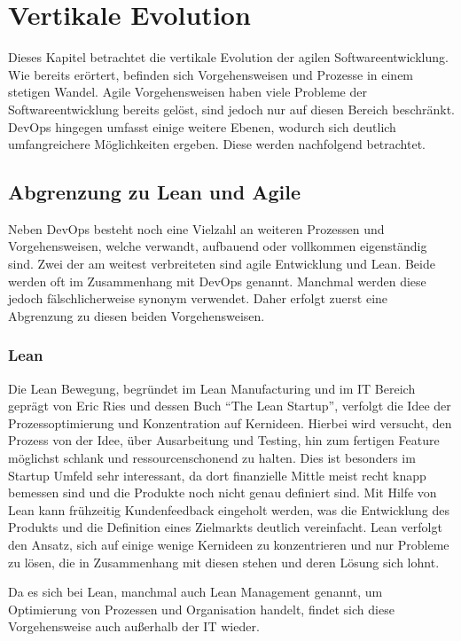\chapter{Vertikale Evolution} %
Dieses Kapitel betrachtet die vertikale Evolution der agilen Softwareentwicklung. Wie bereits erörtert, befinden sich Vorgehensweisen und Prozesse in einem stetigen Wandel. Agile Vorgehensweisen haben viele Probleme der Softwareentwicklung bereits gelöst, sind jedoch nur auf diesen Bereich beschränkt. DevOps hingegen umfasst einige weitere Ebenen, wodurch sich deutlich umfangreichere Möglichkeiten ergeben. Diese werden nachfolgend betrachtet.

\section{Abgrenzung zu Lean und Agile} %
Neben DevOps besteht noch eine Vielzahl an weiteren Prozessen und Vorgehensweisen, welche verwandt, aufbauend oder vollkommen eigenständig sind. Zwei der am weitest verbreiteten sind agile Entwicklung und Lean. Beide werden oft im Zusammenhang mit DevOps genannt. Manchmal werden diese jedoch fälschlicherweise synonym verwendet. Daher erfolgt zuerst eine Abgrenzung zu diesen beiden Vorgehensweisen.

\subsection{Lean}
Die Lean Bewegung, begründet im Lean Manufacturing und im IT Bereich geprägt von Eric Ries und dessen Buch \enquote{The Lean Startup}, verfolgt die Idee der Prozessoptimierung und Konzentration auf Kernideen. 
Hierbei wird versucht, den Prozess von der Idee, über Ausarbeitung und Testing, hin zum fertigen Feature möglichst schlank und ressourcenschonend zu halten. 
Dies ist besonders im Startup Umfeld sehr interessant, da dort finanzielle Mittle meist recht knapp bemessen sind und die Produkte noch nicht genau definiert sind. 
Mit Hilfe von Lean kann frühzeitig Kundenfeedback eingeholt werden, was die Entwicklung des Produkts und die Definition eines Zielmarkts deutlich vereinfacht.
Lean verfolgt den Ansatz, sich auf einige wenige Kernideen zu konzentrieren und nur Probleme zu lösen, die in Zusammenhang mit diesen stehen und deren Lösung sich lohnt. \parencite[Vgl.][S. 18 ff.]{ries:2011}

Da es sich bei Lean, manchmal auch Lean Management genannt, um Optimierung von Prozessen und Organisation handelt, findet sich diese Vorgehensweise auch außerhalb der IT wieder.

